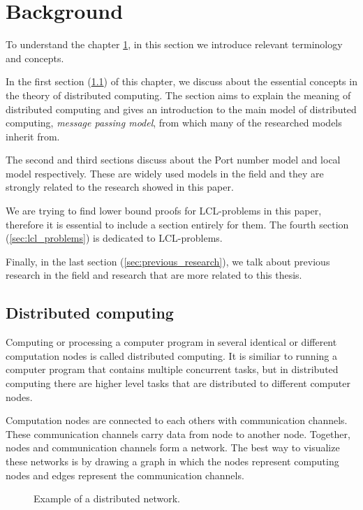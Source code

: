 \section{Background}
To understand the chapter \ref{}, in this section we introduce relevant terminology and concepts.

In the first section (\ref{sec:distributed_computing}) of this chapter, we discuss about the essential concepts in the theory of distributed computing.
The section aims to explain the meaning of distributed computing and gives an introduction to the main model of distributed computing, \emph{message passing model}, from which many of the researched models inherit from.

The second and third sections discuss about the Port number model and local model respectively.
These are widely used models in the field and they are strongly related to the research showed in this paper.

We are trying to find lower bound proofs for LCL-problems in this paper, therefore it is essential to include a section entirely for them.
The fourth section (\ref{sec:lcl_problems}) is dedicated to LCL-problems.

Finally, in the last section (\ref{sec:previous_research}), we talk about previous research in the field and research that are more related to this thesis.

\subsection{Distributed computing} \label{sec:distributed_computing}
Computing or processing a computer program in several identical or different computation nodes is called distributed computing.
It is similiar to running a computer program that contains multiple concurrent tasks, but in distributed computing there are higher level tasks that are distributed to different computer nodes.

Computation nodes are connected to each others with communication channels.
These communication channels carry data from node to another node.
Together, nodes and communication channels form a network.
The best way to visualize these networks is by drawing a graph in which the nodes represent computing nodes and edges represent the communication channels.

\begin{figure}[h]
  \centering
\caption{Example of a distributed network.}
\label{fig:graph1}
\end{figure}

